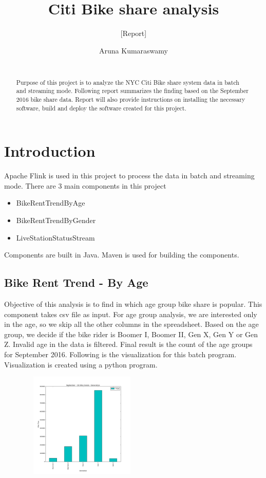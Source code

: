 \documentclass{sig-alternate-05-2015}
\begin{document}
\title{Citi Bike share analysis}  
\subtitle{[Report]}


\author{
\alignauthor
Aruna Kumaraswamy\\
       \\
}


\maketitle
\begin{abstract}
    Purpose of this project is to analyze the NYC Citi Bike share system data in batch and streaming mode. Following report summarizes the finding based on the September 2016 bike share data. Report will also provide instructions on installing the necessary software, build and deploy the software created for this project.
\end{abstract}


\section{Introduction}
Apache Flink is used in this project to process the data in batch and streaming mode. There are 3 main components in this project
\begin{itemize}
    \item BikeRentTrendByAge
    \item BikeRentTrendByGender
    \item LiveStationStatusStream
\end{itemize}
Components are built in Java. Maven is used for building the components.
\subsection {Bike Rent Trend - By Age}
Objective of this analysis is to find in which age group bike share is popular. This component takes csv file as input. For age group analysis, we are interested only in the age, so we skip all the other columns in the spreadsheet. Based on the age group, we decide if the bike rider is Boomer I, Boomer II, Gen X, Gen Y or Gen Z. Invalid age in the data is filtered. Final result is the count of the age groups for September 2016. Following is the visualization for this batch program. Visualization is created using a python program.

\includegraphics[width=8cm, height=5cm]{tripsbygeneration}
\end{document}
